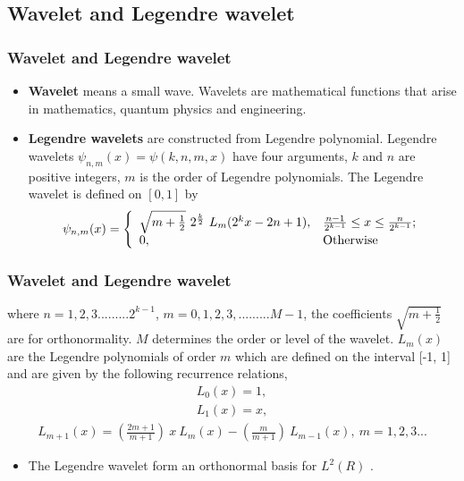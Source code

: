 \documentclass{beamer}
\begin{document}
\subsection{Wavelet and Legendre wavelet}
\begin{frame}\frametitle{Wavelet and Legendre wavelet}
	\begin{itemize}
		\justifying
	\item \textbf{Wavelet} means a small wave. Wavelets are mathematical functions that arise in mathematics, quantum physics and engineering. 
	\item \textbf{Legendre wavelets} are constructed from Legendre polynomial. Legendre wavelets $\psi_{n,m}(x)=\psi(k,n,m,x)$ have four arguments, $k$ and $n$ are positive integers, $m$ is the order of Legendre polynomials. The Legendre wavelet \cite{Razaghi} is defined on $[0,1]$ by
	\small	
	\begin{eqnarray}
	\psi_{n,m}(x)=\left\{
	\begin{array}{ll}
	\sqrt{m+\frac{1}{2}}~2^{\frac{k}{2}}~L_{m}(2^{k}x-2n+1), & \hbox{$\frac{n-1}{2^{k-1}} \leq x \leq\frac{n}{2^{k-1}} $;} \\
	0, & \hbox{Otherwise}
	\end{array}
	\right.
	\end{eqnarray}
	\normalsize	
	\end{itemize}
\end{frame}
\begin{frame}\frametitle{Wavelet and Legendre wavelet}
	\justifying
	where $n=1,2,3.........2^{k-1}$, $m=0,1,2,3,.........M-1$, the coefficients $\sqrt{m+\frac{1}{2}}$ are for orthonormality. $M$ determines the order or level of the wavelet.
	$L_{m}(x)$ are the Legendre polynomials of order $m$ which are defined on the interval [-1, 1] and are given by the following recurrence relations,
	\begin{align}
	L_{0}(x)=1,\nonumber\\
	L_{1}(x)=x,\nonumber
	\end{align}
	\small
	\begin{eqnarray}
	L_{m+1}(x)=\left(\frac{2m+1}{m+1}\right)~x~L_{m}(x)-\left(\frac{m}{m+1}\right)~L_{m-1}(x),~m=1,2,3...\nonumber
	\end{eqnarray}
	\small
	\begin{itemize}
	\item The Legendre wavelet form an orthonormal basis for $L^{2}(R)$ \cite{Khellat,Razaghi,Raz}.
\end{itemize}
\end{frame}
\end{document}
